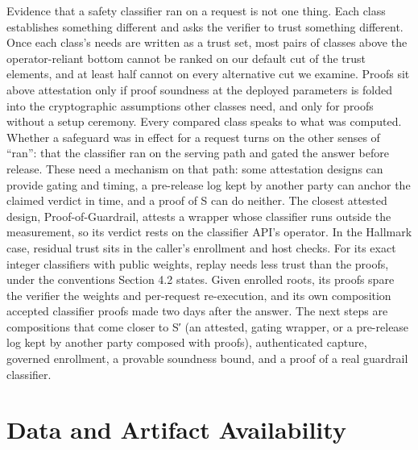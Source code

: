 \documentclass[11pt]{article}
\begin{document}
Evidence that a safety classifier ran on a request is not one thing. Each class establishes something different and asks the verifier to trust something different. Once each class's needs are written as a trust set, most pairs of classes above the operator-reliant bottom cannot be ranked on our default cut of the trust elements, and at least half cannot on every alternative cut we examine. Proofs sit above attestation only if proof soundness at the deployed parameters is folded into the cryptographic assumptions other classes need, and only for proofs without a setup ceremony. Every compared class speaks to what was computed. Whether a safeguard was in effect for a request turns on the other senses of ``ran'': that the classifier ran on the serving path and gated the answer before release. These need a mechanism on that path: some attestation designs can provide gating and timing, a pre-release log kept by another party can anchor the claimed verdict in time, and a proof of S can do neither. The closest attested design, Proof-of-Guardrail, attests a wrapper whose classifier runs outside the measurement, so its verdict rests on the classifier API's operator. In the Hallmark case, residual trust sits in the caller's enrollment and host checks. For its exact integer classifiers with public weights, replay needs less trust than the proofs, under the conventions Section 4.2 states. Given enrolled roots, its proofs spare the verifier the weights and per-request re-execution, and its own composition accepted classifier proofs made two days after the answer. The next steps are compositions that come closer to S′ (an attested, gating wrapper, or a pre-release log kept by another party composed with proofs), authenticated capture, governed enrollment, a provable soundness bound, and a proof of a real guardrail classifier.

\section*{Data and Artifact Availability}
\end{document}
